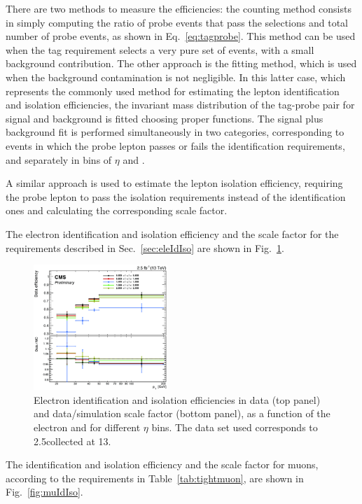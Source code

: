 There are two methods to measure the efficiencies: the counting method consists in simply computing the ratio of probe events that pass the selections and total number of probe events, as shown in Eq.~\eqref{eq:tagprobe}. This method can be used when the tag requirement selects a very pure set of events, with a small background contribution. The other approach is the fitting method, which is used when the background contamination is not negligible. In this latter case, which represents the commonly used method for estimating the lepton identification and isolation efficiencies, the invariant mass distribution of the tag-probe pair for signal and background is fitted choosing proper functions. The signal plus background fit is performed simultaneously in two categories, corresponding to events in which the probe lepton passes or fails the identification requirements, and separately in bins of $\eta$ and \pt.

A similar approach is used to estimate the lepton isolation efficiency, requiring the probe lepton to pass the isolation requirements instead of the identification ones and calculating the corresponding scale factor.

The electron identification and isolation efficiency and the scale factor for the requirements described in Sec.~\ref{sec:eleIdIso} are shown in Fig.~\ref{fig:eleIdIso}.

\begin{figure}[htb]
\centering
\includegraphics[width=0.45\textwidth]{images/eleIdIsoEff.pdf}
\caption{Electron identification and isolation efficiencies in data (top panel) and data/simulation scale factor (bottom panel), as a function of the electron \pt and for different $\eta$ bins. The data set used corresponds to 2.5\ifb collected at 13\TeV.}\label{fig:eleIdIso}
\end{figure}
	
The identification and isolation efficiency and the scale factor for muons, according to the requirements in Table~\ref{tab:tightmuon}, are shown in Fig.~\ref{fig:muIdIso}.
	

